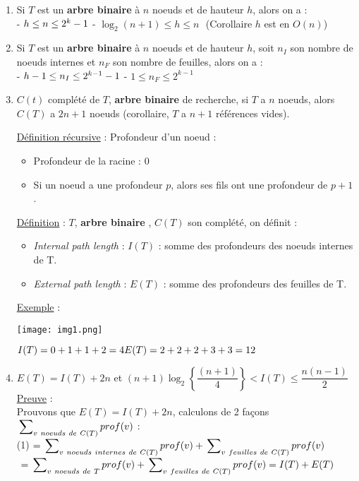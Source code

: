 \documentclass{article}
\newcommand{\ab}{\textbf{arbre binaire }}
\begin{document}
\begin{enumerate}
\item Si $T$ est un \ab à $n$ noeuds et de hauteur $h$, alors on a : \\
- $h \leq n \leq 2^k-1 \\$
- $\log_2(n+1) \leq h \leq n \ \ \ $(Corollaire $h$ est en $O(n)$)

\item Si $T$ est un \ab à $n$ noeuds et de hauteur $h$, soit $n_I$ son nombre de noeuds internes et $n_F$
son nombre de feuilles, alors on a : \\
- $h-1 \leq n_I \leq 2^{k-1}-1 \\$
- $1 \leq n_F \leq 2^{k-1}$

\item $C(t)$ complété de $T$, \ab de recherche, si $T$ a $n$ noeuds, alors $C(T)$ a $2n+1$ noeuds (corollaire, $T$ a $n+1$
références vides).

\underline{Définition récursive} : Profondeur d'un noeud :
\begin{itemize}
\item Profondeur de la racine : 0
\item Si un noeud a une profondeur $p$, alors ses fils ont une profondeur de $p+1$.
\end{itemize}

\underline{Définition} : $T$, \ab, $C(T)$ son complété, on définit :

\begin{itemize}
\item \textit{Internal path length} : $I(T)$ : somme des profondeurs des noeuds internes de T.
\item \textit{External path length} : $E(T)$ : somme des profondeurs des feuilles de T.
\end{itemize}
 
\underline{Exemple} : 

\texttt{[image: img1.png]}

$I(T) = 0+1+1+2 = 4 \\
E(T) = 2+2+2+3+3 = 12$

\item $E(T) = I(T) + 2n$ et $(n+1) \log_2\left\{\dfrac{(n+1)}{4}\right\} < I(T) \leq \dfrac{n(n-1)}{2}$ \\

\underline{Preuve} : \\
Prouvons que $E(T) = I(T) + 2n$, calculons de 2 façons $\sideset{}{_{v\ noeuds\ de\ C(T)}}\sum{prof(v)}$ : \\
(1) $ = \sideset{}{_{v\ noeuds\ internes\ de\ C(T)}}\sum{prof(v)} + \sideset{}{_{v\ feuilles\ de\ C(T)}}\sum{prof(v)} $ \\
    $\ = \sideset{}{_{v\ noeuds\ de\ T}}\sum{prof(v)} + \sideset{}{_{v\ feuilles\ de\ C(T)}}\sum{prof(v)} = I(T)+E(T)$ \\


\end{enumerate}
\end{document}
